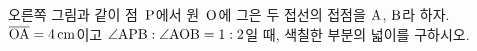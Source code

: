 \noindent\begin{minipage}[t]{0.58\linewidth}\vspace{0pt}\raggedright 오른쪽 그림과 같이 점~$\mathrm{P}$에서 원~$\mathrm{O}$에 그은 두 접선의 접점을 $\mathrm{A}$, $\mathrm{B}$라 하자. $\overline{\mathrm{OA}}=4\,\mathrm{cm}$이고 $\angle\mathrm{APB}:\angle\mathrm{AOB}=1:2$일 때, 색칠한 부분의 넓이를 구하시오.\end{minipage}\hfill\begin{minipage}[t]{0.4\linewidth}\vspace{0pt}\centering \resizebox{\ifdim\width>\linewidth\linewidth\else\width\fi}{!}{}\end{minipage}\par

